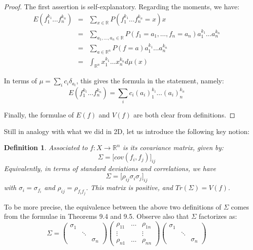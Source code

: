 \documentclass[12pt]{amsbook}
\newtheorem{definition}[theorem]{Definition}
\begin{document}
\begin{proof}
The first assertion is self-explanatory. Regarding the moments, we have:
\begin{eqnarray*}
E(f_1^{k_1}\ldots f_n^{k_n})
&=&\sum_{x\in\mathbb R}P(f_1^{k_1}\ldots f_n^{k_n}=x)x\\
&=&\sum_{a_1,\ldots,a_n\in\mathbb R}P(f_1=a_1,\ldots,f_n=a_n)a_1^{k_1}\ldots a_n^{k_n}\\
&=&\sum_{a\in\mathbb R^n}P(f=a)a_1^{k_1}\ldots a_n^{k_n}\\
&=&\int_{\mathbb R^n}x_1^{k_1}\ldots x_n^{k_n}d\mu(x)
\end{eqnarray*}

In terms of $\mu=\sum_i c_i\delta_{a_i}$, this gives the formula in the statement, namely:
$$E(f_1^{k_1}\ldots f_n^{k_n})=\sum_ic_i(a_i)_1^{k_1}\ldots(a_i)_n^{k_n}$$

Finally, the formulae of $E(f)$ and $V(f)$ are both clear from definitions.
\end{proof}

Still in analogy with what we did in 2D, let us introduce the following key notion:

\begin{definition}
Associated to $f:X\to\mathbb R^n$ is its covariance matrix, given by:
$$\Sigma=\Big[cov(f_i,f_j)\Big]_{ij}$$
Equivalently, in terms of standard deviations and correlations, we have
$$\Sigma=\Big[\rho_{ij}\sigma_i\sigma_j\Big]_{ij}$$
with $\sigma_i=\sigma_{f_i}$ and $\rho_{ij}=\rho_{f_if_j}$. This matrix is positive, and $Tr(\Sigma)=V(f)$.
\end{definition}

To be more precise, the equivalence between the above two definitions of $\Sigma$ comes from the formulae in Theorems 9.4 and 9.5. Observe also that $\Sigma$ factorizes as:
$$\Sigma=\begin{pmatrix}\sigma_1\\ &\ddots\\ &&\sigma_n\end{pmatrix}
\begin{pmatrix}\rho_{11}&\ldots&\rho_{1n}\\ \vdots&&\vdots\\ \rho_{n1}&\ldots&\rho_{nn}\end{pmatrix}
\begin{pmatrix}\sigma_1\\ &\ddots\\ &&\sigma_n\end{pmatrix}$$
\end{document}
